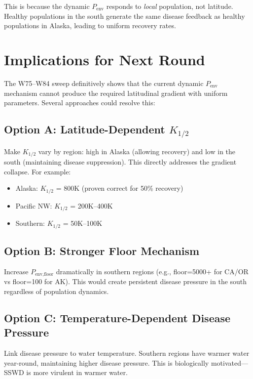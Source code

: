 \documentclass[11pt,a4paper]{article}
\begin{document}
This is because the dynamic $P_{\text{env}}$ responds to \textit{local} population, not latitude. Healthy populations in the south generate the same disease feedback as healthy populations in Alaska, leading to uniform recovery rates.


\section{Implications for Next Round}

The W75--W84 sweep definitively shows that the current dynamic $P_{\text{env}}$ mechanism cannot produce the required latitudinal gradient with uniform parameters. Several approaches could resolve this:

\subsection{Option A: Latitude-Dependent $K_{1/2}$}
Make $K_{1/2}$ vary by region: high in Alaska (allowing recovery) and low in the south (maintaining disease suppression). This directly addresses the gradient collapse. For example:
\begin{itemize}[nosep]
    \item Alaska: $K_{1/2}$ = 800K (proven correct for 50\% recovery)
    \item Pacific NW: $K_{1/2}$ = 200K--400K
    \item Southern: $K_{1/2}$ = 50K--100K
\end{itemize}

\subsection{Option B: Stronger Floor Mechanism}
Increase $P_{\text{env,floor}}$ dramatically in southern regions (e.g., floor=5000+ for CA/OR vs floor=100 for AK). This would create persistent disease pressure in the south regardless of population dynamics.

\subsection{Option C: Temperature-Dependent Disease Pressure}
Link disease pressure to water temperature. Southern regions have warmer water year-round, maintaining higher disease pressure. This is biologically motivated---SSWD is more virulent in warmer water.
\end{document}
